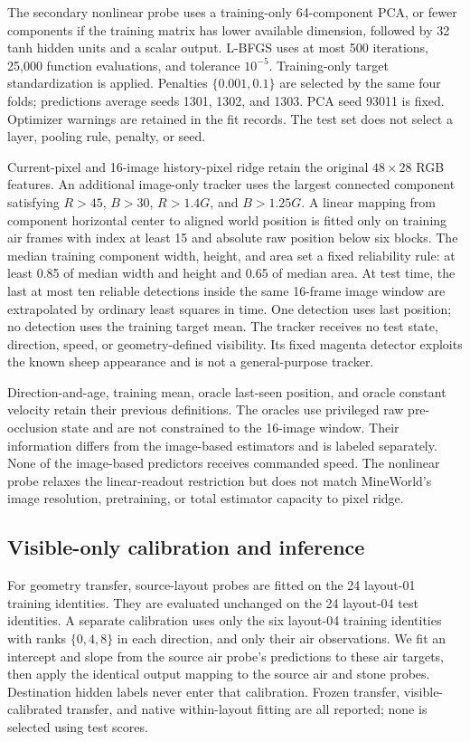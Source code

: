 The secondary nonlinear probe uses a training-only 64-component PCA, or fewer components if the training matrix has lower available dimension, followed by 32 tanh hidden units and a scalar output. L-BFGS uses at most 500 iterations, 25,000 function evaluations, and tolerance $10^{-5}$. Training-only target standardization is applied. Penalties $\{0.001,0.1\}$ are selected by the same four folds; predictions average seeds 1301, 1302, and 1303. PCA seed 93011 is fixed. Optimizer warnings are retained in the fit records. The test set does not select a layer, pooling rule, penalty, or seed.

Current-pixel and 16-image history-pixel ridge retain the original $48\times28$ RGB features. An additional image-only tracker uses the largest connected component satisfying $R>45$, $B>30$, $R>1.4G$, and $B>1.25G$. A linear mapping from component horizontal center to aligned world position is fitted only on training air frames with index at least 15 and absolute raw position below six blocks. The median training component width, height, and area set a fixed reliability rule: at least 0.85 of median width and height and 0.65 of median area. At test time, the last at most ten reliable detections inside the same 16-frame image window are extrapolated by ordinary least squares in time. One detection uses last position; no detection uses the training target mean. The tracker receives no test state, direction, speed, or geometry-defined visibility. Its fixed magenta detector exploits the known sheep appearance and is not a general-purpose tracker.

Direction-and-age, training mean, oracle last-seen position, and oracle constant velocity retain their previous definitions. The oracles use privileged raw pre-occlusion state and are not constrained to the 16-image window. Their information differs from the image-based estimators and is labeled separately. None of the image-based predictors receives commanded speed. The nonlinear probe relaxes the linear-readout restriction but does not match MineWorld's image resolution, pretraining, or total estimator capacity to pixel ridge.

\subsection{Visible-only calibration and inference}
For geometry transfer, source-layout probes are fitted on the 24 layout-01 training identities. They are evaluated unchanged on the 24 layout-04 test identities. A separate calibration uses only the six layout-04 training identities with ranks $\{0,4,8\}$ in each direction, and only their air observations. We fit an intercept and slope from the source air probe's predictions to these air targets, then apply the identical output mapping to the source air and stone probes. Destination hidden labels never enter that calibration. Frozen transfer, visible-calibrated transfer, and native within-layout fitting are all reported; none is selected using test scores.

